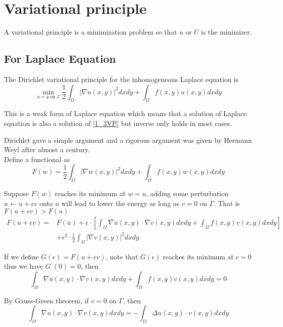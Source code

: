 	
	\section{Variational principle}
	
	A variational principle is a minimization problem so that $u$ or $U$ is the minimizer. 
	
	\subsection{For Laplace Equation}
	
	The Dirichlet variational principle for the inhomogeneous Laplace equation is 
	\begin{equation}
		\min_{u=g \text{ on } \Gamma} \frac{1}{2}\int_{\Omega}|\nabla u(x,y)|^2dxdy + \int_{\Omega}f(x,y)u(x,y)dxdy
		\label{1_3VP}
	\end{equation}
	
	This is a weak form of Laplace equation which means that a solution of Laplace equation is also a solution of \eqref{1_3VP} but inverse only holds in most cases.
	
	Dirichlet gave a simple argument and a rigorous argument was given by Hermann Weyl after almost a century.\\
	
	Define a functional as $$F(w) = \frac{1}{2}\int_{\Omega}|\nabla w(x,y)|^2dxdy + \int_{\Omega}f(x,y)w(x,y)dxdy$$
	
	Suppose $F(w)$ reaches its minimum at $w = u$, adding some perturbation$u \leftarrow u + \epsilon v$ onto $u$ will lead to lower the energy as long as $v = 0$ on $\Gamma$. That is $F(u + \epsilon v) > F(u)$
	\begin{align*}
	F(u + \epsilon v) =& F(u) + \epsilon \cdot [\int_{\Omega}\nabla u(x,y) \cdot \nabla v(x,y)dxdy + \int_{\Omega}f(x,y)v(x,y)dxdy ] \\
	&+ \epsilon^2 \cdot \frac{1}{2}\int_{\Omega}| \nabla v(x,y) |^2dxdy
	\end{align*}
	
	If we define $G(\epsilon) = F(u + \epsilon v)$, note that $G(\epsilon)$ reaches its minimum at $\epsilon = 0$ thus we have $G^{'}(0) = 0$, then $$\int_{\Omega}\nabla u(x,y) \cdot \nabla v(x,y)dxdy + \int_{\Omega}f(x,y)v(x,y)dxdy = 0$$ 
	
	By Gauss-Green theorem, if $v = 0$ on $\Gamma$, then $$ \int_{\Omega}\nabla u(x,y)\cdot \nabla v(x,y) dxdy = - \int_{\Omega} \Delta u(x,y) \cdot v(x,y)dxdy $$
	
